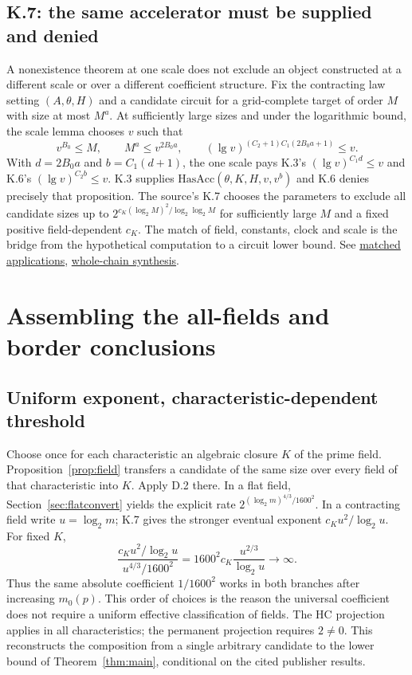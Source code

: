 \documentclass[11pt,letterpaper]{article}
\theoremstyle{definition}\newtheorem{definition}[theorem]{Definition}\newtheorem{example}[theorem]{Example}
\theoremstyle{remark}\newtheorem{remark}[theorem]{Remark}
\newcommand{\pub}[3]{\href{https://github.com/anthropics/formal-math/blob/11b6c7e3c927df2658f513b6b68ea7f8929c62c5/vp-vnp/#1\#L#2}{#3}}
\newcommand{\aud}[2]{\href{https://github.com/nousentllc/VP-VNP-Review/blob/567303d0bcf4f9d54390437b137752446e58ccd6/#1}{#2}}
\begin{document}
\subsection{K.7: the same accelerator must be supplied and denied}\label{sec:match}
A nonexistence theorem at one scale does not exclude an object constructed at a different scale or over a different coefficient structure. Fix the contracting law setting $(A,\theta,H)$ and a candidate circuit for a grid-complete target of order $M$ with size at most $M^a$. At sufficiently large sizes and under the logarithmic bound, the scale lemma chooses $v$ such that
\[
 v^{B_0}\le M,\qquad M^a\le v^{2B_0a},\qquad
 (\lg v)^{(C_2+1)C_1(2B_0a+1)}\le v.
\]
With $d=2B_0a$ and $b=C_1(d+1)$, the one scale pays K.3's $(\lg v)^{C_1d}\le v$ and K.6's $(\lg v)^{C_2b}\le v$. K.3 supplies $\mathrm{HasAcc}(\theta,K,H,v,v^b)$ and K.6 denies precisely that proposition. The source's K.7 chooses the parameters to exclude all candidate sizes up to $2^{c_K(\log_2M)^2/\log_2\log_2M}$ for sufficiently large $M$ and a fixed positive field-dependent $c_K$. The match of field, constants, clock and scale is the bridge from the hypothetical computation to a circuit lower bound. See \pub{Paper/Scales.lean}{141}{matched applications}, \aud{passes/14e-circuit-to-contradiction.md}{whole-chain synthesis}.

\section{Assembling the all-fields and border conclusions}\label{sec:assembly}
\subsection{Uniform exponent, characteristic-dependent threshold}
Choose once for each characteristic an algebraic closure $K$ of the prime field. Proposition~\ref{prop:field} transfers a candidate of the same size over every field of that characteristic into $K$. Apply D.2 there. In a flat field, Section~\ref{sec:flatconvert} yields the explicit rate $2^{(\log_2m)^{4/3}/1600^2}$. In a contracting field write $u=\log_2m$; K.7 gives the stronger eventual exponent $c_K u^2/\log_2u$. For fixed $K$,
\[
 \frac{c_Ku^2/\log_2u}{u^{4/3}/1600^2}
 =1600^2c_K\frac{u^{2/3}}{\log_2u}\longrightarrow\infty.
\]
Thus the same absolute coefficient $1/1600^2$ works in both branches after increasing $m_0(p)$. This order of choices is the reason the universal coefficient does not require a uniform effective classification of fields. The HC projection applies in all characteristics; the permanent projection requires $2\ne0$. This reconstructs the composition from a single arbitrary candidate to the lower bound of Theorem~\ref{thm:main}, conditional on the cited publisher results.
\end{document}
